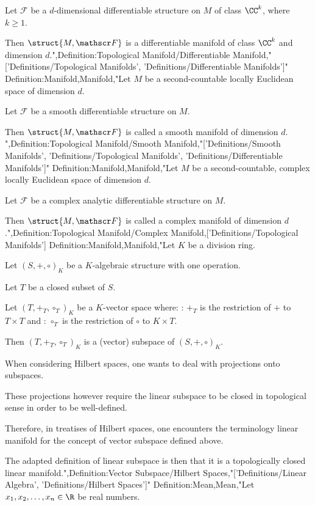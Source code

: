 Let $\mathscr F$ be a $d$-dimensional differentiable structure on $M$ of class $\CC^k$, where $k \ge 1$.


Then $\struct {M, \mathscr F}$ is a differentiable manifold of class $\CC^k$ and dimension $d$.",Definition:Topological Manifold/Differentiable Manifold,"['Definitions/Topological Manifolds', 'Definitions/Differentiable Manifolds']"
Definition:Manifold,Manifold,"Let $M$ be a second-countable locally Euclidean space of dimension $d$. 

Let $\mathscr F$ be a smooth differentiable structure on $M$.


Then $\struct {M, \mathscr F}$ is called a smooth manifold of dimension $d$.
",Definition:Topological Manifold/Smooth Manifold,"['Definitions/Smooth Manifolds', 'Definitions/Topological Manifolds', 'Definitions/Differentiable Manifolds']"
Definition:Manifold,Manifold,"Let $M$ be a second-countable, complex locally Euclidean space of dimension $d$. 

Let $\mathscr F$ be a complex analytic differentiable structure on $M$.


Then $\struct {M, \mathscr F}$ is called a complex manifold of dimension $d$.",Definition:Topological Manifold/Complex Manifold,['Definitions/Topological Manifolds']
Definition:Manifold,Manifold,"Let $K$ be a division ring.

Let $\left({S, +, \circ}\right)_K$ be a $K$-algebraic structure with one operation.


Let $T$ be a closed subset of $S$.

Let $\left({T, +_T, \circ_T}\right)_K$ be a $K$-vector space where:
: $+_T$ is the restriction of $+$ to $T \times T$ and
: $\circ_T$ is the restriction of $\circ$ to $K \times T$.


Then $\left({T, +_T, \circ_T}\right)_K$ is a (vector) subspace of $\left({S, +, \circ}\right)_K$.


When considering Hilbert spaces, one wants to deal with projections onto subspaces.

These projections however require the linear subspace to be closed in topological sense in order to be well-defined.

Therefore, in treatises of Hilbert spaces, one encounters the terminology linear manifold for the concept of vector subspace defined above.

The adapted definition of linear subspace is then that it is a topologically closed linear manifold.",Definition:Vector Subspace/Hilbert Spaces,"['Definitions/Linear Algebra', 'Definitions/Hilbert Spaces']"
Definition:Mean,Mean,"Let $x_1, x_2, \ldots, x_n \in \R$ be real numbers.


